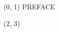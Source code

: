 \documentclass[10pt]{article}
\begin{document}
\begin{textblock}{23} (0, 1)
\center\huge PREFACE
\end{textblock}


\begin{textblock}{20} (2, 3)
    {}
\end{textblock}
\end{document}

